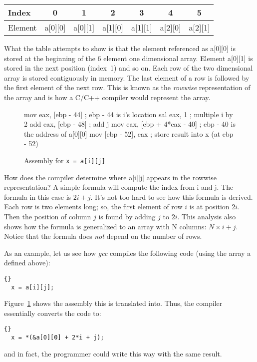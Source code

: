 \parbox{\textwidth}{
\vspace{0.5em}
\centering
\begin{tabular}{||l|c|c|c|c|c|c||}
\hline
Index & 0 & 1 & 2 & 3 & 4 & 5 \\
\hline
Element & a[0][0] & a[0][1] & a[1][0] & a[1][1] & a[2][0] & a[2][1]  \\
\hline
\end{tabular}
\vspace{0.5em}
}
\noindent What the table attempts to show is that the element referenced as 
{\code a[0][0]} is stored at the beginning of the 6 element one
dimensional array. Element {\code a[0][1]} is stored in the next
position (index~1) and so on. Each row of the two dimensional array is
stored contiguously in memory. The last element of a row is followed
by the first element of the next row. This is known as the
\emph{rowwise} representation of the array and is how a C/C++ compiler would
represent the array.

\begin{figure}[t]
\begin{AsmCodeListing}[]
   mov    eax, [ebp - 44]          ; ebp - 44 is i's location
   sal    eax, 1                   ; multiple i by 2
   add    eax, [ebp - 48]          ; add j
   mov    eax, [ebp + 4*eax - 40]  ; ebp - 40 is the address of a[0][0]
   mov    [ebp - 52], eax          ; store result into x (at ebp - 52)
\end{AsmCodeListing}
\caption{ Assembly for \lstinline|x = a[i][j]| \label{fig:aij}}
\end{figure}

How does the compiler determine where {\code a[i][j]} appears in the rowwise
representation? A simple formula will compute the index from {\code i} and
{\code j}. The formula in this case is $2i + j$. It's not too hard to see how
this formula is derived. Each row is two elements long; so, the first element
of row $i$ is at position $2i$. Then the position of column $j$ is found by
adding $j$ to $2i$. This analysis also shows how the formula is generalized 
to an array with {\code N} columns: $N \times i + j$. Notice that the formula
does \emph{not} depend on the number of rows.

As an example, let us see how \emph{gcc} compiles the following code (using the
array {\code a} defined above):
\begin{lstlisting}[stepnumber=0]{}
  x = a[i][j];
\end{lstlisting}
Figure~\ref{fig:aij} shows the assembly this is translated into.
Thus, the compiler essentially converts the code to:
\begin{lstlisting}[stepnumber=0]{}
  x = *(&a[0][0] + 2*i + j);
\end{lstlisting}
and in fact, the programmer could write this way with the same result.


